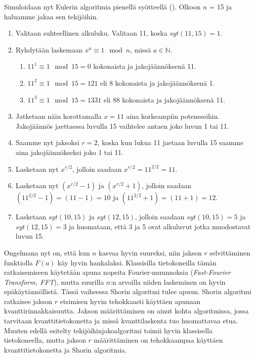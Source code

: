 Simuloidaan nyt Eulerin algoritmia pienellä syötteellä (\cite{doi:10.1080/23742917.2016.1226650}). Olkoon $n$ = 15 ja haluamme jakaa sen tekijöihin.

\begin{enumerate}
    \item Valitaan suhteellinen alkuluku. Valitaan 11, koska $syt(11,15) = 1$.
    
    \item Ryhdytään laskemaan $x^{a} \equiv 1 \mod n$, missä $a \in \mathbb{N}$.
    
    \begin{enumerate}
    
        \item $11^{1} \equiv 1 \mod 15 = 0$ kokonaista ja jakojäännöksenä 11.
        
        \item $11^{2} \equiv 1 \mod 15 = 121$ eli 8 kokonaista ja jakojäännöksenä 1.
        
        \item $11^{3} \equiv 1 \mod 15 = 1331$ eli 88 kokonaista ja jakojäännöksenä 11.
    \end{enumerate}
    
    \item Jatketaan näin korottamalla $x = 11$ aina korkeampiin potensseihin. Jakojäännös jaettaessa luvulla 15 vaihtelee antaen joko luvun 1 tai 11.
    
    \item Saamme nyt jaksoksi $r = 2$, koska kun lukua 11 jaetaan luvulla 15 saamme aina jakojäännökseksi joko 1 tai 11.
    
    \item Lasketaan nyt $x^{r/2}$, jolloin saadaan $x^{r/2} = 11^{2/2} = 11$.
    
    \item Lasketaan nyt $(x^{r/2}-1)$ ja $(x^{r/2}+1)$, jolloin saadaan $(11^{2/2} - 1) = (11 - 1) = 10$ ja $(11^{2/2} + 1) = (11 + 1) = 12$.
    
    \item Lasketaan $syt(10,15)$ ja $syt(12,15)$, jolloin saadaan $syt(10,15) = 5$ ja $syt(12,15) = 3$ ja huomataan, että 3 ja 5 ovat alkuluvut jotka muodostavat luvun 15.
    
\end{enumerate}

Ongelmana nyt on, että kun $n$ kasvaa hyvin suureksi, niin jakson $r$ selvittäminen funktiolla $F(a)$ käy hyvin hankalaksi. Klassisilla tietokoneilla tämän ratkaisemiseen käytetään apuna nopeita Fourier-muunnoksia (\emph{Fast-Fourier Transform, FFT}), mutta suurilla $n$:n arvoilla niiden laskeminen on hyvin epäkäytännöllistä. Tässä vaiheessa Shorin algoritmi tulee apuun. Shorin algoritmi ratkaisee jakson $r$ etsimisen hyvin tehokkaasti käyttäen apunaan kvanttirinnakkaisuutta. Jakson määrittäminen on ainut kohta algoritmissa, jossa tarvitaan kvanttitietokonetta ja missä kvanttilaskenta tuo huomattavaa etua. Muuten edellä esitelty tekijöihinjakoalgoritmi toimii hyvin klassisella tietokoneella, mutta jakson $r$ määrittäminen on tehokkaampaa käyttäen kvanttitietokonetta ja Shorin algoritmia. 